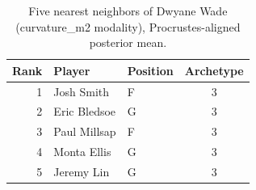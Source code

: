 \begin{table}[htbp]
  \centering\small
  \begin{tabular}{rllc}
    \toprule
    Rank & Player & Position & Archetype \\
    \midrule
    1 & Josh Smith & F & 3 \\
    2 & Eric Bledsoe & G & 3 \\
    3 & Paul Millsap & F & 3 \\
    4 & Monta Ellis & G & 3 \\
    5 & Jeremy Lin & G & 3 \\
    \bottomrule
  \end{tabular}
  \caption{Five nearest neighbors of Dwyane Wade (curvature_m2 modality), Procrustes-aligned posterior mean.}
  \label{tab:Dwyane_Wade_neighbors_curvature_m2}
\end{table}

